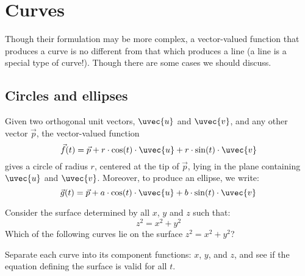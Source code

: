 \documentclass{ximera}
\begin{document}
\section{Curves}

Though their formulation may be more complex, a vector-valued function
that produces a curve is no different from that which produces a line
(a line is a special type of curve!). Though there are some cases we should discuss.

\subsection{Circles and ellipses}

Given two orthogonal unit vectors, $\uvec{u}$ and $\uvec{v}$, and any
other vector $\vec{p}$, the vector-valued function
\[
\vec{f}(t) = \vec{p}+r\cdot \cos(t)\cdot \uvec{u} + r \cdot \sin(t)\cdot\uvec{v}
\]
gives a circle of radius $r$, centered at the tip of $\vec{p}$, lying
in the plane containing $\uvec{u}$ and $\uvec{v}$. Moreover, to produce
an ellipse, we write:
\[
\vec{g}(t) = \vec{p}+a\cdot \cos(t)\cdot \uvec{u} + b \cdot \sin(t)\cdot\uvec{v}
\]

\begin{question}
  Consider the surface determined by all $x$, $y$ and $z$ such that:
  \[
  z^2=x^2+y^2
  \]
   Which of the following curves lie on the surface $z^2=x^2+y^2$?
  \begin{selectAll}
  \end{selectAll}
  \begin{hint}
    Separate each curve into its component functions: $x$, $y$, and
    $z$, and see if the equation defining the surface is valid for all
    $t$.
  \end{hint}
\end{question}
\end{document}

